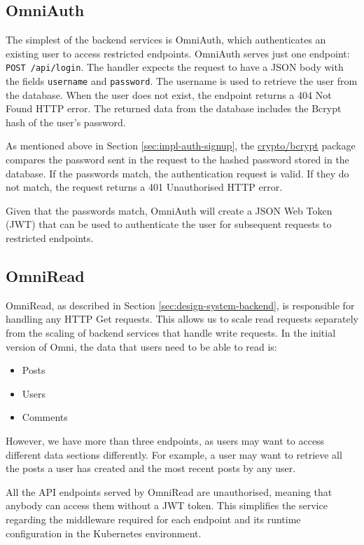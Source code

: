 \subsection{OmniAuth}
The simplest of the backend services is OmniAuth, which authenticates an existing user to access restricted endpoints.
OmniAuth serves just one endpoint: \verb|POST /api/login|. The handler expects the request to have a JSON body with the fields \verb|username| and \verb|password|. 
The username is used to retrieve the user from the database. When the user does not exist, the endpoint returns a 404 Not Found HTTP error.
The returned data from the database includes the Bcrypt hash of the user's password. 

As mentioned above in Section \ref{sec:impl-auth-signup}, the \underline{\href{https://pkg.go.dev/golang.org/x/crypto/bcrypt}{crypto/bcrypt}} \nocite{gobcryptpkg} package compares the password sent in the request to the hashed password stored in the database.
If the passwords match, the authentication request is valid. If they do not match, the request returns a 401 Unauthorised HTTP error.

Given that the passwords match, OmniAuth will create a JSON Web Token (JWT) that can be used to authenticate the user for subsequent requests to restricted endpoints.

\subsection{OmniRead}
OmniRead, as described in Section \ref{sec:design-system-backend}, is responsible for handling any HTTP Get requests. This allows us to scale read requests separately from the scaling of backend services that handle write requests.
In the initial version of Omni, the data that users need to be able to read is: 
\begin{itemize}
    \item Posts
    \item Users
    \item Comments
\end{itemize}
However, we have more than three endpoints, as users may want to access different data sections differently. For example, a user may want to retrieve all the posts a user has created and the most recent posts by any user. 

All the API endpoints served by OmniRead are unauthorised, meaning that anybody can access them without a JWT token. This simplifies the service regarding the middleware required for each endpoint and its runtime configuration in the Kubernetes environment. 

